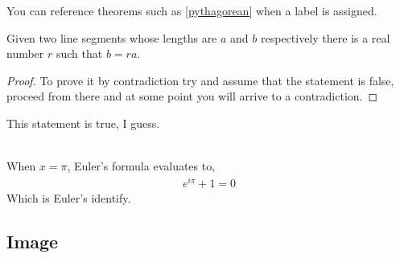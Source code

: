 You can reference theorems such as \ref{pythagorean} when a label is assigned.

\begin{lemma}
Given two line segments whose lengths are \(a\) and \(b\) respectively there 
is a real number \(r\) such that \(b=ra\).
\end{lemma}

\begin{proof}
To prove it by contradiction try and assume that the statement is false,
proceed from there and at some point you will arrive to a contradiction.
\end{proof}

\begin{remark}
This statement is true, I guess.
\end{remark}

\begin{solution}\ \\
When $x=\pi$, Euler's formula evaluates to,
\begin{align*}
    e^{i\pi }+1=0
\end{align*}
Which is Euler's identify.
\end{solution}

\subsection{Image}

